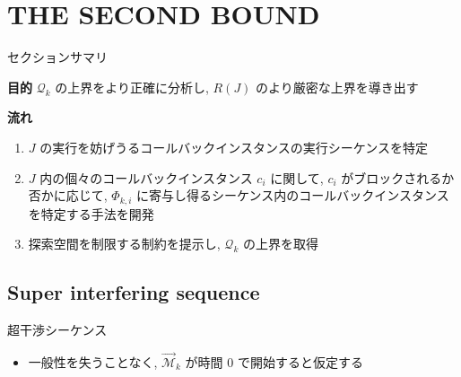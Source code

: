 
\section{THE SECOND BOUND}
\label{sec: the_second_bound}

\begin{frame}{セクションサマリ}
    \begin{itembox}[l]{\textbf{目的}}
        $\mathcal{Q}_{k}$ の上界をより正確に分析し, $R(J)$ のより厳密な上界を導き出す
    \end{itembox}
    \begin{itembox}[l]{\textbf{流れ}}
        \begin{enumerate}
            \item $J$ の実行を妨げうるコールバックインスタンスの実行シーケンスを特定
            \item $J$ 内の個々のコールバックインスタンス $c_{i}$ に関して, $c_{i}$ がブロックされるか否かに応じて, $\Phi_{k, i}$ に寄与し得るシーケンス内のコールバックインスタンスを特定する手法を開発
            \item 探索空間を制限する制約を提示し, $\mathcal{Q}_{k}$ の上界を取得
        \end{enumerate}
    \end{itembox}
\end{frame}

\subsection{Super interfering sequence}
\label{ssec: super_interfering_sequence}

\begin{frame}{超干渉シーケンス}
    \begin{itemize}
        \begin{definition}
            $\mathcal{C}_{k}$ から $J$ への超干渉シーケンス $\overrightarrow{\mathcal{M}}_{k}$ は, $n_{k}(L)$ 個の $\mathcal{C}_{k}$ のインスタンスの実行シーケンスであり, コールバックインスタンスを 1 つずつ順番に実行する
        \end{definition}
        \vspace{5mm}
        \item 一般性を失うことなく,  $\overrightarrow{\mathcal{M}}_{k}$ が時間 0 で開始すると仮定する
    \end{itemize}
\end{frame}


